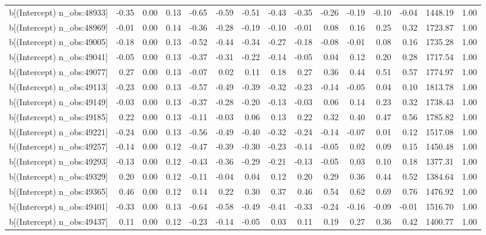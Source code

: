 \begin{table}[ht]
\begin{tabular}{rrrrrrrrrrrrrrr}
  b[(Intercept) n\_obs:48933] & -0.35 & 0.00 & 0.13 & -0.65 & -0.59 & -0.51 & -0.43 & -0.35 & -0.26 & -0.19 & -0.10 & -0.04 & 1448.19 & 1.00 \\ 
  b[(Intercept) n\_obs:48969] & -0.01 & 0.00 & 0.14 & -0.36 & -0.28 & -0.19 & -0.10 & -0.01 & 0.08 & 0.16 & 0.25 & 0.32 & 1723.87 & 1.00 \\ 
  b[(Intercept) n\_obs:49005] & -0.18 & 0.00 & 0.13 & -0.52 & -0.44 & -0.34 & -0.27 & -0.18 & -0.08 & -0.01 & 0.08 & 0.16 & 1735.28 & 1.00 \\ 
  b[(Intercept) n\_obs:49041] & -0.05 & 0.00 & 0.13 & -0.37 & -0.31 & -0.22 & -0.14 & -0.05 & 0.04 & 0.12 & 0.20 & 0.28 & 1717.54 & 1.00 \\ 
  b[(Intercept) n\_obs:49077] & 0.27 & 0.00 & 0.13 & -0.07 & 0.02 & 0.11 & 0.18 & 0.27 & 0.36 & 0.44 & 0.51 & 0.57 & 1774.97 & 1.00 \\ 
  b[(Intercept) n\_obs:49113] & -0.23 & 0.00 & 0.13 & -0.57 & -0.49 & -0.39 & -0.32 & -0.23 & -0.14 & -0.05 & 0.04 & 0.10 & 1813.78 & 1.00 \\ 
  b[(Intercept) n\_obs:49149] & -0.03 & 0.00 & 0.13 & -0.37 & -0.28 & -0.20 & -0.13 & -0.03 & 0.06 & 0.14 & 0.23 & 0.32 & 1738.43 & 1.00 \\ 
  b[(Intercept) n\_obs:49185] & 0.22 & 0.00 & 0.13 & -0.11 & -0.03 & 0.06 & 0.13 & 0.22 & 0.32 & 0.40 & 0.47 & 0.56 & 1785.82 & 1.00 \\ 
  b[(Intercept) n\_obs:49221] & -0.24 & 0.00 & 0.13 & -0.56 & -0.49 & -0.40 & -0.32 & -0.24 & -0.14 & -0.07 & 0.01 & 0.12 & 1517.08 & 1.00 \\ 
  b[(Intercept) n\_obs:49257] & -0.14 & 0.00 & 0.12 & -0.47 & -0.39 & -0.30 & -0.23 & -0.14 & -0.05 & 0.02 & 0.09 & 0.15 & 1450.48 & 1.00 \\ 
  b[(Intercept) n\_obs:49293] & -0.13 & 0.00 & 0.12 & -0.43 & -0.36 & -0.29 & -0.21 & -0.13 & -0.05 & 0.03 & 0.10 & 0.18 & 1377.31 & 1.00 \\ 
  b[(Intercept) n\_obs:49329] & 0.20 & 0.00 & 0.12 & -0.11 & -0.04 & 0.04 & 0.12 & 0.20 & 0.29 & 0.36 & 0.44 & 0.52 & 1384.64 & 1.00 \\ 
  b[(Intercept) n\_obs:49365] & 0.46 & 0.00 & 0.12 & 0.14 & 0.22 & 0.30 & 0.37 & 0.46 & 0.54 & 0.62 & 0.69 & 0.76 & 1476.92 & 1.00 \\ 
  b[(Intercept) n\_obs:49401] & -0.33 & 0.00 & 0.13 & -0.64 & -0.58 & -0.49 & -0.41 & -0.33 & -0.24 & -0.16 & -0.09 & -0.01 & 1516.70 & 1.00 \\ 
  b[(Intercept) n\_obs:49437] & 0.11 & 0.00 & 0.12 & -0.23 & -0.14 & -0.05 & 0.03 & 0.11 & 0.19 & 0.27 & 0.36 & 0.42 & 1400.77 & 1.00 \\ 

\end{tabular}
\end{table}
